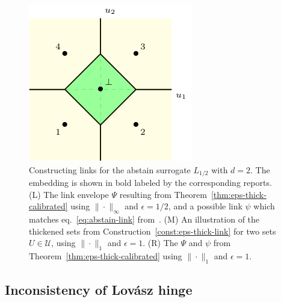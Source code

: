 \documentclass[11pt]{article}
\newcommand{\U}{\mathcal{U}}
\begin{document}
\begin{figure}
\begin{center}
\begin{minipage}{0.32\linewidth}
\end{minipage}\hfill
\begin{minipage}{0.32\linewidth}
\includegraphics[width=\linewidth]{tikz/abstain-link-l1.pdf}
\end{minipage}\hfill
\caption{Constructing links for the abstain surrogate $L_{1/2}$ with $d=2$. The embedding is shown in bold labeled by the corresponding reports. (L) The link envelope $\Psi$ resulting from Theorem~\ref{thm:eps-thick-calibrated} using $\|\cdot\|_\infty$ and $\epsilon = 1/2$, and a possible link $\psi$ which matches eq.~\eqref{eq:abstain-link} from~\cite{ramaswamy2018consistent}.  (M) An illustration of the thickened sets from Construction~\ref{const:eps-thick-link} for two sets $U \in \U$, using $\|\cdot\|_1$ and $\epsilon = 1$. (R) The $\Psi$ and $\psi$ from Theorem~\ref{thm:eps-thick-calibrated} using $\|\cdot\|_1$ and $\epsilon = 1$.}
\label{fig:abstain-links}
\end{center}
\end{figure}


\subsection{Inconsistency of Lov\'asz hinge}
\label{sec:lovasz-hinge}

\newcommand{\dis}{\mathrm{dis}}
\newcommand{\abs}{\mathrm{abs}}
\end{document}
